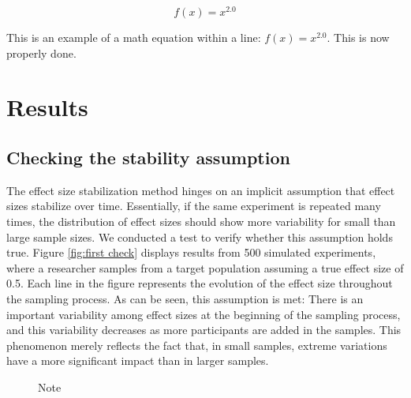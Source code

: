 \documentclass[12pt]{article}
\begin{document}
    \begin{equation}
        f(x) = x^{2.0}
    \end{equation}

    This is an example of a math equation within a line: $f(x) = x^{2.0}$. This is now properly done.

    \section{Results}

    \subsection{Checking the stability assumption}
    The effect size stabilization method hinges on an implicit assumption that effect sizes stabilize over time. Essentially, if the same experiment is repeated many times, the distribution of effect sizes should show more variability for small than large sample sizes. We conducted a test to verify whether this assumption holds true. Figure \ref{fig:first check} displays results from 500 simulated experiments, where a researcher samples from a target population assuming a true effect size of 0.5. Each line in the figure represents the evolution of the effect size throughout the sampling process. As can be seen, this assumption is met: There is an important variability among effect sizes at the beginning of the sampling process, and this variability decreases as more participants are added in the samples. This phenomenon merely reflects the fact that, in small samples, extreme variations have a more significant impact than in larger samples.

    \begin{figure}[t]
        
        \caption{Note}
        \label{fig:firstCheck}
    \end{figure}
\end{document}
